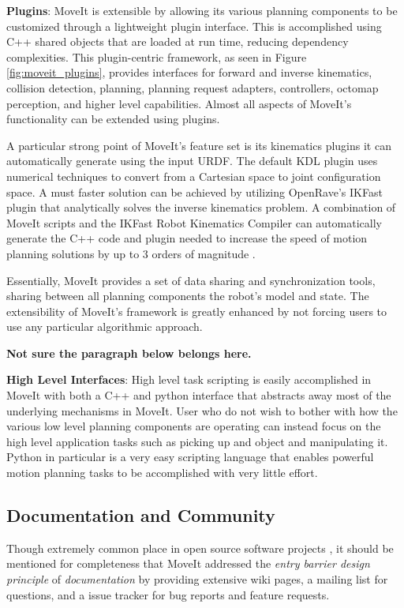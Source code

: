 \documentclass[10pt,journal,compsoc]{joser1}
\begin{document}
{{\bf Plugins}: MoveIt is extensible by allowing its various planning components to be customized through a lightweight plugin interface. This is accomplished using C++ shared objects that are loaded at run time, reducing dependency complexities. This plugin-centric framework, as seen in Figure \ref{fig:moveit_plugins}, provides interfaces for forward and inverse kinematics, collision detection, planning, planning request adapters, controllers, octomap perception, and higher level capabilities. Almost all aspects of MoveIt's functionality can be extended using plugins.

A particular strong point of MoveIt's feature set is its kinematics plugins it can automatically generate using the input URDF. The default KDL plugin uses numerical techniques to convert from a Cartesian space to joint configuration space. A must faster solution can be achieved by utilizing OpenRave's IKFast \cite{ikfast} plugin that analytically solves the inverse kinematics problem. A combination of MoveIt scripts and the IKFast Robot Kinematics Compiler can automatically generate the C++ code and plugin needed to increase the speed of motion planning solutions by up to 3 orders of magnitude \cite{ikfast}.

Essentially, MoveIt provides a set of data sharing and synchronization tools, sharing between all planning components the robot's model and state. The extensibility of MoveIt's framework is greatly enhanced by not forcing users to use any particular algorithmic approach. 

\textbf{Not sure the paragraph below belongs here.}

{\bf High Level Interfaces}: High level task scripting is easily accomplished in MoveIt with both a C++ and python interface that abstracts away most of the underlying mechanisms in MoveIt. User who do not wish to bother with how the various low level planning components are operating can instead focus on the high level application tasks such as picking up and object and manipulating it. Python in particular is a very easy scripting language that enables powerful motion planning tasks to be accomplished with very little effort.

\subsection{Documentation and Community}

Though extremely common place in open source software projects \cite{bruyninckx2001open}, it should be mentioned for completeness that MoveIt addressed the \textit{entry barrier design principle} of \textit{documentation} by providing extensive wiki pages, a mailing list for questions, and a issue tracker for bug reports and feature requests.

}
\end{document}
